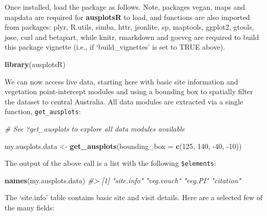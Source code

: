 \documentclass[
]{article}
\newenvironment{Shaded}{\begin{snugshade}}{\end{snugshade}}
\newcommand{\CommentTok}[1]{\textcolor[rgb]{0.56,0.35,0.01}{\textit{#1}}}
\newcommand{\DataTypeTok}[1]{\textcolor[rgb]{0.13,0.29,0.53}{#1}}
\newcommand{\DecValTok}[1]{\textcolor[rgb]{0.00,0.00,0.81}{#1}}
\newcommand{\KeywordTok}[1]{\textcolor[rgb]{0.13,0.29,0.53}{\textbf{#1}}}
\newcommand{\NormalTok}[1]{#1}
\newcommand{\StringTok}[1]{\textcolor[rgb]{0.31,0.60,0.02}{#1}}
\begin{document}
Once installed, load the package as follows. Note, packages vegan, maps
and mapdata are required for \textbf{ausplotsR} to load, and functions
are also imported from packages: plyr, R.utils, simba, httr, jsonlite,
sp, maptools, ggplot2, gtools, jose, curl and betapart, while knitr,
rmarkdown and goeveg are required to build this package vignette (i.e.,
if `build\_vignettes' is set to TRUE above).

\begin{Shaded}
\begin{Highlighting}[]
\KeywordTok{library}\NormalTok{(ausplotsR)}
\end{Highlighting}
\end{Shaded}

We can now access live data, starting here with basic site information
and vegetation point-intercept modules and using a bounding box to
spatially filter the dataset to central Australia. All data modules are
extracted via a single function, \texttt{get\_ausplots}:

\begin{Shaded}
\begin{Highlighting}[]
\CommentTok{# See ?get_ausplots to explore all data modules available}
\end{Highlighting}
\end{Shaded}

\begin{Shaded}
\begin{Highlighting}[]
\NormalTok{my.ausplots.data <-}\StringTok{ }\KeywordTok{get_ausplots}\NormalTok{(}\DataTypeTok{bounding_box =} \KeywordTok{c}\NormalTok{(}\DecValTok{125}\NormalTok{, }\DecValTok{140}\NormalTok{, }\DecValTok{-40}\NormalTok{, }\DecValTok{-10}\NormalTok{))}
\end{Highlighting}
\end{Shaded}

The output of the above call is a list with the following
\texttt{\$elements}:

\begin{Shaded}
\begin{Highlighting}[]
\KeywordTok{names}\NormalTok{(my.ausplots.data)}
\CommentTok{#> [1] "site.info" "veg.vouch" "veg.PI"    "citation"}
\end{Highlighting}
\end{Shaded}

The `site.info' table contains basic site and visit details. Here are a
selected few of the many fields:
\end{document}

